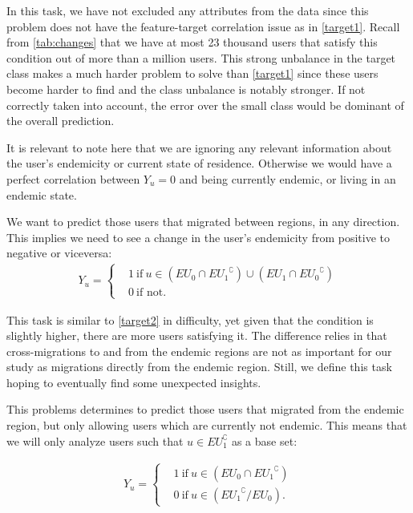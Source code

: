In this task, we have not excluded any attributes from the data since this problem does not have the feature-target correlation issue as in \cref{target1}.
Recall from \cref{tab:changes} that we have at most 23 thousand users that satisfy this condition out of more than a million users.
This strong unbalance in the target class makes a much harder problem to solve than \cref{target1} since these users become harder to find and the class unbalance is notably stronger.
If not correctly taken into account, the error over the small class would be dominant of the overall prediction.

It is relevant to note here that we are ignoring any relevant information about the user's endemicity or current state of residence.
Otherwise we would have a perfect correlation between $Y_u=0$ and being currently endemic, or living in an endemic state.



\begin{problem}\label{target3}
We want to predict those users that migrated between regions, in any direction. This implies we need to see a change in the user's endemicity from positive to negative or viceversa:
\begin{align*}
			Y_u =
			\begin{cases}
				&1 \ \mbox{if} \ u \in (EU_{0} \cap { EU_{1} }^{\complement}) \cup (EU_{1} \cap { EU_{0} }^{\complement}) \\
				&0 \ \mbox{if not}.
			\end{cases}
		\end{align*}
\end{problem}

This task is similar to \cref{target2} in difficulty, yet given that the condition is slightly higher, there are more users satisfying it.
The difference relies in that cross-migrations to and from the endemic regions are not as important for our study as migrations directly from the endemic region.
Still, we define this task hoping to eventually find some unexpected insights.


\begin{problem}\label{target4}
This problems determines to predict those users that migrated from the endemic region, but only allowing users which are currently not endemic.
This means that we will only analyze users such that $u \in EU_{1}^{\complement}$ as a base set:

\begin{align*}
			Y_u =
			\begin{cases}
				& 1 \ \mbox{if} \ u \in ( EU_{0} \cap { EU_{1} }^{\complement})    \\
				& 0 \ \mbox{if} \ u \in ( { EU_{1} }^{\complement} / EU_{0}).
			\end{cases}
		\end{align*}
\end{problem}

